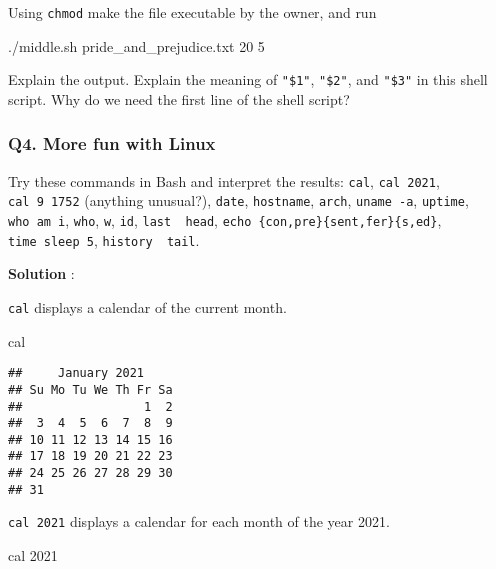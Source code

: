 \documentclass[
]{article}
\newenvironment{Shaded}{\begin{snugshade}}{\end{snugshade}}
\newcommand{\ExtensionTok}[1]{#1}
\newcommand{\FunctionTok}[1]{\textcolor[rgb]{0.00,0.00,0.00}{#1}}
\newcommand{\NormalTok}[1]{#1}
\begin{document}
\begin{enumerate}
  Using \texttt{chmod} make the file executable by the owner, and run

\begin{Shaded}
\begin{Highlighting}[]
\ExtensionTok{./middle.sh}\NormalTok{ pride_and_prejudice.txt 20 5}
\end{Highlighting}
\end{Shaded}

  Explain the output. Explain the meaning of \texttt{"\$1"},
  \texttt{"\$2"}, and \texttt{"\$3"} in this shell script. Why do we
  need the first line of the shell script?
\end{enumerate}

\hypertarget{q4.-more-fun-with-linux}{%
\subsubsection{Q4. More fun with Linux}\label{q4.-more-fun-with-linux}}

Try these commands in Bash and interpret the results: \texttt{cal},
\texttt{cal\ 2021}, \texttt{cal\ 9\ 1752} (anything unusual?),
\texttt{date}, \texttt{hostname}, \texttt{arch}, \texttt{uname\ -a},
\texttt{uptime}, \texttt{who\ am\ i}, \texttt{who}, \texttt{w},
\texttt{id}, \texttt{last\ \textbar{}\ head},
\texttt{echo\ \{con,pre\}\{sent,fer\}\{s,ed\}}, \texttt{time\ sleep\ 5},
\texttt{history\ \textbar{}\ tail}.

\textbf{Solution} :

\texttt{cal} displays a calendar of the current month.

\begin{Shaded}
\begin{Highlighting}[]
\FunctionTok{cal}
\end{Highlighting}
\end{Shaded}

\begin{verbatim}
##     January 2021    
## Su Mo Tu We Th Fr Sa
##                 1  2
##  3  4  5  6  7  8  9
## 10 11 12 13 14 15 16
## 17 18 19 20 21 22 23
## 24 25 26 27 28 29 30
## 31
\end{verbatim}

\texttt{cal\ 2021} displays a calendar for each month of the year 2021.

\begin{Shaded}
\begin{Highlighting}[]
\FunctionTok{cal}\NormalTok{ 2021}
\end{Highlighting}
\end{Shaded}
\end{document}
